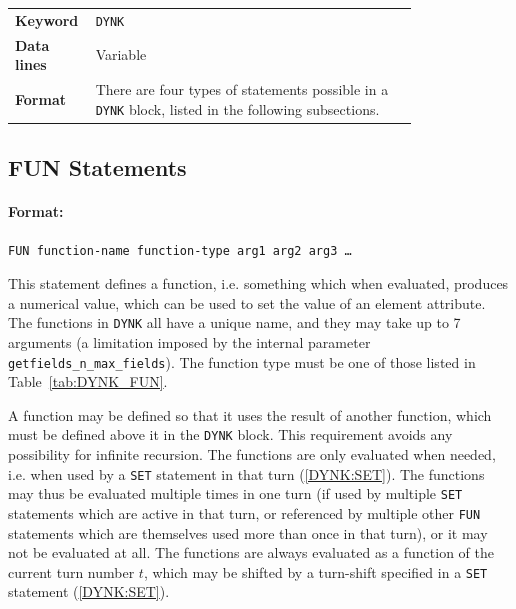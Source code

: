 \bigskip
\begin{tabular}{@{}lp{0.8\linewidth}}
    \textbf{Keyword}    & \texttt{DYNK}\index{DYNK} \\
    \textbf{Data lines} & Variable \\
    \textbf{Format}     & There are four types of statements possible in a \texttt{DYNK} block, listed in the following subsections.\\
\end{tabular}

\bigskip

\subsection{FUN Statements} \label{DYNK:FUN}

\paragraph{Format:}
\texttt{FUN function-name function-type arg1 arg2 arg3 \ldots}

\bigskip
This statement defines a function, i.e. something which when evaluated, produces a numerical value, which can be used to set the value of an element attribute.
The functions in \texttt{DYNK} all have a unique name, and they may take up to 7 arguments (a limitation imposed by the internal parameter \texttt{getfields\_n\_max\_fields}).
The function type must be one of those listed in Table~\ref{tab:DYNK_FUN}.

A function may be defined so that it uses the result of another function, which must be defined above it in the \texttt{DYNK} block.
This requirement avoids any possibility for infinite recursion.
The functions are only evaluated when needed, i.e. when used by a \texttt{SET} statement in that turn (\ref{DYNK:SET}).
The functions may thus be evaluated multiple times in one turn (if used by multiple \texttt{SET} statements which are active in that turn, or referenced by multiple other \texttt{FUN} statements which are themselves used more than once in that turn), or it may not be evaluated at all.
The functions are always evaluated as a function of the current turn number $t$, which may be shifted by a turn-shift specified in a \texttt{SET} statement (\ref{DYNK:SET}).


